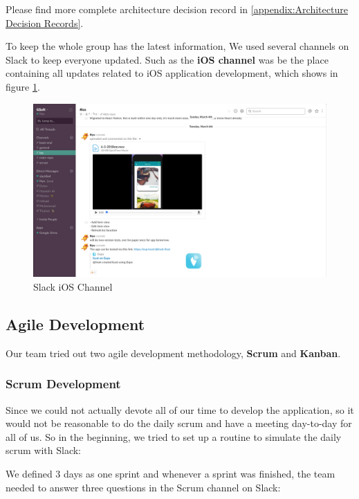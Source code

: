 \documentclass[12pt,a4paper]{article}
\begin{document}
        Please find more complete architecture decision record in \ref{appendix:Architecture Decision Records}.
        
        To keep the whole group has the latest information, We used several channels on Slack to keep everyone updated. Such as the {\bf iOS channel} was be the place containing all updates related to iOS application development, which shows in figure \ref{fig:Slack iOS Channel}. 
        
        \begin{figure}[H]
          \centering
          \includegraphics[width=1\textwidth]{../assets/development-records-slack-ios-channel.png}
          \caption{Slack iOS Channel}
          \label{fig:Slack iOS Channel}
        \end{figure}

      \subsection{Agile Development} 
        
        Our team tried out two agile development methodology, {\bf Scrum} and {\bf Kanban}.

        \subsubsection{Scrum Development}
          Since we could not actually devote all of our time to develop the application, so it would not be reasonable to do the daily scrum and have a meeting day-to-day for all of us. So in the beginning, we tried to set up a routine to simulate the daily scrum with Slack:

          We defined 3 days as one sprint and whenever a sprint was finished, the team needed to answer three questions in the Scrum channel on Slack:
          
\end{document}
